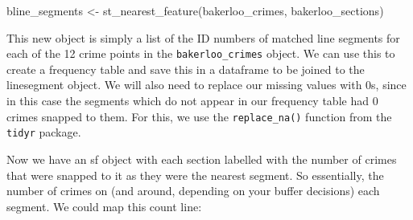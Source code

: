 \documentclass[
  krantz2]{krantz}
\makeatletter
\newenvironment{Shaded}{\begin{snugshade}}{\end{snugshade}}
\newcommand{\AttributeTok}[1]{\textcolor[rgb]{0.61,0.61,0.61}{#1}}
\newcommand{\CommentTok}[1]{\textcolor[rgb]{0.37,0.37,0.37}{\textit{#1}}}
\newcommand{\DecValTok}[1]{\textcolor[rgb]{0.06,0.06,0.06}{#1}}
\newcommand{\FunctionTok}[1]{\textcolor[rgb]{0,0,0}{#1}}
\newcommand{\NormalTok}[1]{#1}
\newcommand{\OtherTok}[1]{\textcolor[rgb]{0.37,0.37,0.37}{#1}}
\newcommand{\SpecialCharTok}[1]{\textcolor[rgb]{0,0,0}{#1}}
\newcommand{\StringTok}[1]{\textcolor[rgb]{0.5,0.5,0.5}{#1}}
\newenvironment{kframe}{%
\medskip{}
\setlength{\fboxsep}{.8em}
 \def\at@end@of@kframe{}%
 \ifinner\ifhmode%
  \def\at@end@of@kframe{\end{minipage}}%
  \begin{minipage}{\columnwidth}%
 \fi\fi%
 \def\FrameCommand##1{\hskip\@totalleftmargin \hskip-\fboxsep
 \colorbox{shadecolor}{##1}\hskip-\fboxsep
     \hskip-\linewidth \hskip-\@totalleftmargin \hskip\columnwidth}%
 \MakeFramed {\advance\hsize-\width
   \@totalleftmargin\z@ \linewidth\hsize
   \@setminipage}}%
 {\par\unskip\endMakeFramed%
 \at@end@of@kframe}
\renewenvironment{Shaded}{\begin{kframe}}{\end{kframe}}
\makeatother
\begin{document}
\begin{Shaded}
\begin{Highlighting}[]
\NormalTok{bline\_segments }\OtherTok{\textless{}{-}} \FunctionTok{st\_nearest\_feature}\NormalTok{(bakerloo\_crimes, bakerloo\_sections)}
\end{Highlighting}
\end{Shaded}

This new object is simply a list of the ID numbers of matched line segments for each of the 12 crime points in the \texttt{bakerloo\_crimes} object. We can use this to create a frequency table and save this in a dataframe to be joined to the linesegment object. We will also need to replace our missing values with 0s, since in this case the segments which do not appear in our frequency table had 0 crimes snapped to them. For this, we use the \texttt{replace\_na()} function from the \texttt{tidyr} package.

\begin{Shaded}
\end{Shaded}

Now we have an sf object with each section labelled with the number of crimes that were snapped to it as they were the nearest segment. So essentially, the number of crimes on (and around, depending on your buffer decisions) each segment. We could map this count line:
\end{document}
